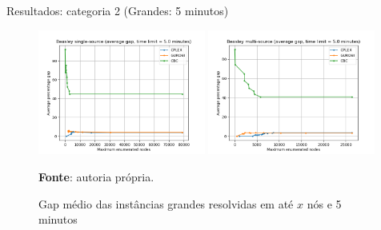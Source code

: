\documentclass[aspectratio=169]{beamer}
\begin{document}
	\begin{frame}{Resultados: categoria 2 (Grandes: 5 minutos)} %
		
		\begin{figure}[H]
			\begin{center}
				\caption{Gap médio das instâncias grandes resolvidas em até $x$ nós e 5 minutos \cite{Beasley}}
				
				\includegraphics[width=0.49\textwidth]{res/Beasley SS large 300 - Average gap x Nodes.png}
				\includegraphics[width=0.49\textwidth]{res/Beasley MS large 300 - Average gap x Nodes.png}				
				\label{Gap:n:Beasley:300}
				
				\textbf{Fonte}: autoria própria.
			\end{center}
		\end{figure}
		
	\end{frame}
	
\end{document}
